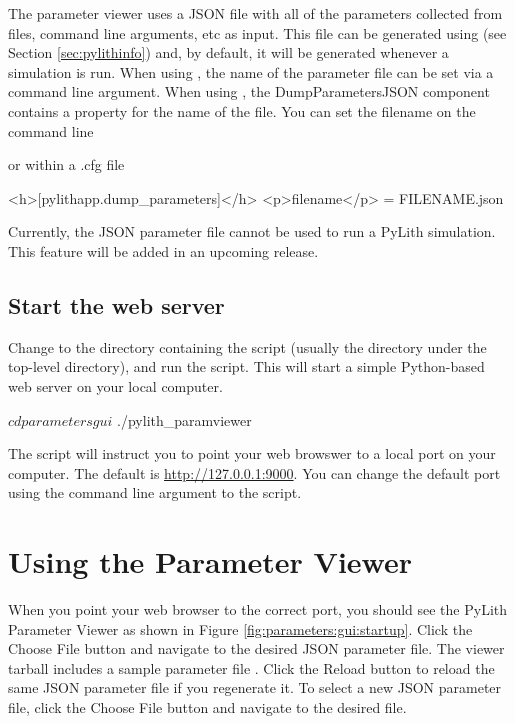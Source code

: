 The parameter viewer uses a JSON file with all of the parameters
collected from  files, command line arguments, etc as
input. This file can be generated using  (see
Section \ref{sec:pylithinfo}) and, by default, it will be generated
whenever a  simulation is run. When using
, the name of the parameter file can be set via a
command line argument. When using , the
DumpParametersJSON component contains a property for the name of the
file. You can set the filename on the command line
or within a .cfg file
\begin{cfg}
<h>[pylithapp.dump_parameters]</h>
<p>filename</p> = FILENAME.json
\end{cfg}
Currently, the JSON parameter file cannot be used to run a PyLith
simulation. This feature will be added in an upcoming release.


\subsection{Start the web server}

Change to the directory containing the 
script (usually the  directory under the top-level
 directory), and run the 
script. This will start a simple Python-based web server on your local
computer.
\begin{shell}
$ cd parametersgui
$ ./pylith_paramviewer
\end{shell}
The script will instruct you to point your web browswer to a local
port on your computer. The default is \url{http://127.0.0.1:9000}.
You can change the default port using the  command
line argument to the  script.


\section{Using the Parameter Viewer}

When you point your web browser to the correct port, you should see
the PyLith Parameter Viewer as shown in Figure
\ref{fig:parameters:gui:startup}.  Click the \textsf{Choose File}
button and navigate to the desired JSON parameter file. The viewer
tarball includes a sample parameter file
. Click the \textsf{Reload} button
to reload the same JSON parameter file if you regenerate it. To select
a new JSON parameter file, click the \textsf{Choose File} button and
navigate to the desired file.

